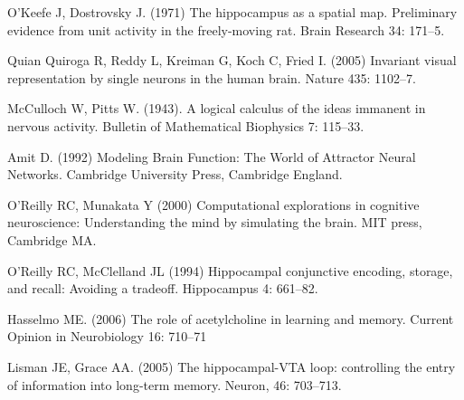 \documentclass[12pt]{article}
\begin{document}
\begin{thebibliography}{10}

O'Keefe J, Dostrovsky J. (1971) The hippocampus as a spatial map. Preliminary evidence from unit activity in the freely-moving rat.
\newblock Brain Research 34: 171--5.

Quian Quiroga R, Reddy L, Kreiman G, Koch C, Fried I. (2005) Invariant visual representation by single neurons in the human brain.
\newblock Nature 435: 1102--7.

McCulloch W, Pitts W. (1943). A logical calculus of the ideas immanent in nervous activity. 
\newblock Bulletin of Mathematical Biophysics 7: 115--33.

 Amit D. (1992) Modeling Brain Function: The World
  of Attractor Neural Networks.
\newblock Cambridge University Press, Cambridge England.

O'Reilly RC, Munakata Y (2000) Computational explorations in cognitive neuroscience: Understanding the mind by simulating the brain.
\newblock MIT press, Cambridge MA.

O’Reilly RC, McClelland JL (1994) Hippocampal conjunctive encoding, storage, and recall: Avoiding a tradeoff.
\newblock Hippocampus 4: 661--82.

Hasselmo ME. (2006) The role of acetylcholine in learning and memory.
\newblock Current Opinion in Neurobiology 16: 710--71

Lisman JE, Grace AA. (2005) The hippocampal-VTA loop: controlling the entry of information into long-term memory.
\newblock Neuron, 46: 703--713.

\end{thebibliography}
\end{document}
